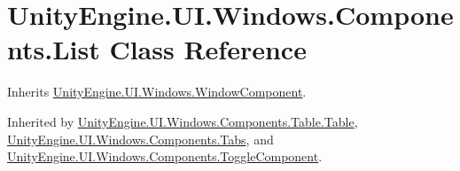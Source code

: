 \hypertarget{class_unity_engine_1_1_u_i_1_1_windows_1_1_components_1_1_list}{}\section{Unity\+Engine.\+U\+I.\+Windows.\+Components.\+List Class Reference}
\label{class_unity_engine_1_1_u_i_1_1_windows_1_1_components_1_1_list}


Inherits \hyperlink{class_unity_engine_1_1_u_i_1_1_windows_1_1_window_component}{Unity\+Engine.\+U\+I.\+Windows.\+Window\+Component}.



Inherited by \hyperlink{class_unity_engine_1_1_u_i_1_1_windows_1_1_components_1_1_table_1_1_table}{Unity\+Engine.\+U\+I.\+Windows.\+Components.\+Table.\+Table}, \hyperlink{class_unity_engine_1_1_u_i_1_1_windows_1_1_components_1_1_tabs}{Unity\+Engine.\+U\+I.\+Windows.\+Components.\+Tabs}, and \hyperlink{class_unity_engine_1_1_u_i_1_1_windows_1_1_components_1_1_toggle_component}{Unity\+Engine.\+U\+I.\+Windows.\+Components.\+Toggle\+Component}.

